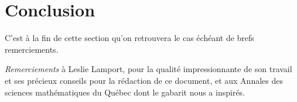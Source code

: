 \section{Conclusion}\label{sec6}

C'est à la fin de cette section qu'on retrouvera le cas échéant de brefs remerciements.

{\em Remerciements} 
à Leslie Lamport\cite{lamp}, pour la qualité impressionnante de son travail et ses précieux conseils pour la rédaction de ce document, et aux Annales des sciences mathématiques du Québec dont le gabarit nous a inspirés.



